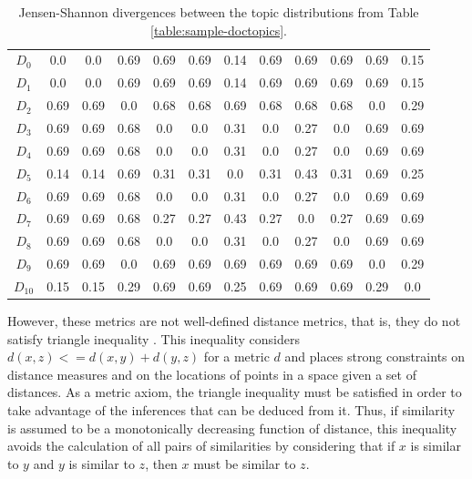 \begin{table}[!htbp]
\centering%
\small
\begin{tabularx}{\linewidth}{CCCCCCCCCCCC}
\toprule
\heading{} &  &  &  &  &  &  &  &  &  &  &  \\
\midrule
\midrule
$D_0$&0.0&0.0&0.69&0.69&0.69&0.14&0.69&0.69&0.69&0.69&0.15\\
\midrule
$D_1$&0.0&0.0&0.69&0.69&0.69&0.14&0.69&0.69&0.69&0.69&0.15\\
\midrule
$D_2$&0.69&0.69&0.0&0.68&0.68&0.69&0.68&0.68&0.68&0.0&0.29\\
\midrule
$D_3$&0.69&0.69&0.68&0.0&0.0&0.31&0.0&0.27&0.0&0.69&0.69\\
\midrule
$D_4$&0.69&0.69&0.68&0.0&0.0&0.31&0.0&0.27&0.0&0.69&0.69\\
\midrule
$D_5$&0.14&0.14&0.69&0.31&0.31&0.0&0.31&0.43&0.31&0.69&0.25\\
\midrule
$D_6$&0.69&0.69&0.68&0.0&0.0&0.31&0.0&0.27&0.0&0.69&0.69\\
\midrule
$D_7$&0.69&0.69&0.68&0.27&0.27&0.43&0.27&0.0&0.27&0.69&0.69\\
\midrule
$D_8$&0.69&0.69&0.68&0.0&0.0&0.31&0.0&0.27&0.0&0.69&0.69\\
\midrule
$D_9$&0.69&0.69&0.0&0.69&0.69&0.69&0.69&0.69&0.69&0.0&0.29\\
\midrule
$D_{10}$&0.15&0.15&0.29&0.69&0.69&0.25&0.69&0.69&0.69&0.29&0.0\\
\midrule
\bottomrule
\end{tabularx}
\caption{Jensen-Shannon divergences between the topic distributions from Table \ref{table:sample-doctopics}.}
\label{table:js-distances}
\end{table}

However, these metrics are not well-defined distance metrics, that is, they do not satisfy triangle inequality \citep{Charikar2002}. This inequality considers $d(x, z) <= d(x, y) + d(y, z)$ for a metric $d$ \citep{Griffiths2007} and places strong constraints on distance measures and on the locations of points in a space given a set of distances. As a metric axiom, the triangle inequality must be satisfied in order to take advantage of the inferences that can be deduced from it. Thus, if similarity is assumed to be a monotonically decreasing function of distance, this inequality avoids the calculation of all pairs of similarities by considering that if $x$ is similar to $y$ and $y$ is similar to $z$, then $x$ must be similar to $z$. 

